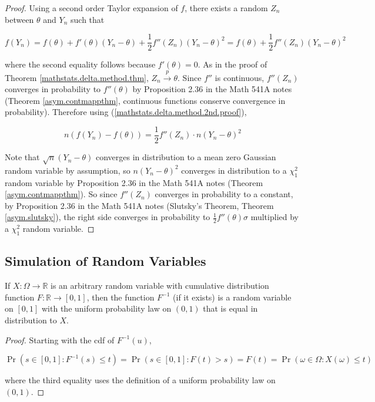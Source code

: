 \begin{proof} Using a second order Taylor expansion of \(f\), there exists a random \(Z_n\) between \(\theta\) and \(Y_n\) such that

\begin{equation}\label{mathstats.delta.method.2nd.proof}
f(Y_n) = f(\theta) + f'(\theta)(Y_n - \theta) + \frac{1}{2} f''(Z_n)(Y_n - \theta)^2 = f(\theta) + \frac{1}{2} f''(Z_n)(Y_n - \theta)^2
\end{equation}

where the second equality follows because \(f'(\theta)=0\). As in the proof of Theorem \ref{mathstats.delta.method.thm}, \(Z_n \xrightarrow{p} \theta\). Since \(f''\) is continuous, \(f''(Z_n)\) converges in probability to \(f''(\theta)\) by Proposition 2.36 in the Math 541A notes (Theorem \ref{asym.contmappthm}, continuous functions conserve convergence in probability). Therefore using (\ref{mathstats.delta.method.2nd.proof}),

\[
n(f(Y_n) - f(\theta)) = \frac{1}{2} f''(Z_n) \cdot n(Y_n - \theta)^2
\]

Note that \(\sqrt{n} (Y_n - \theta)\) converges in distribution to a mean zero Gaussian random variable by assumption, so \( n(Y_n - \theta)^2\) converges in distribution to a \(\chi_1^2\) random variable by Proposition 2.36 in the Math 541A notes (Theorem \ref{asym.contmappthm}). So since \(f''(Z_n)\) converges in probability to a constant, by Proposition 2.36 in the Math 541A notes (Slutsky's Theorem, Theorem \ref{asym.slutsky}), the right side converges in probability to \(\frac{1}{2} f''(\theta) \sigma\) multiplied by a \(\chi_1^2\) random variable.

\end{proof}

\subsection{Simulation of Random Variables}

\begin{proposition} If \(X: \Omega \to \mathbb{R}\) is an arbitrary random variable with cumulative distribution function \(F: \mathbb{R} \to [0,1]\), then the function \(F^{-1}\) (if it exists) is a random variable on \([0,1]\) with the uniform probability law on \((0,1)\) that is equal in distribution to \(X\).

\end{proposition}

\begin{proof} Starting with the cdf of \(F^{-1}(u)\),

\[
\Pr(s \in [0,1]: F^{-1}(s) \leq t) = \Pr(s \in [0,1]: F(t) > s) = F(t) = \Pr( \omega \in \Omega: X(\omega) \leq t)
\]

where the third equality uses the definition of a uniform probability law on \((0,1)\).

\end{proof}

